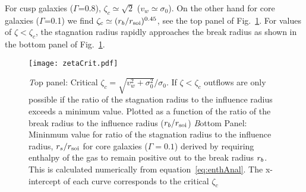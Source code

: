 For cusp galaxies ($\Gamma$=0.8), $\zeta_c\simeq \sqrt 2$
($v_w\simeq\sigma_0$).  On the other hand for core galaxies
($\Gamma$=0.1) we find $\zeta_c\simeq (r_b/r_{\rm soi})^{0.45}$, see the top
panel of Fig.~\ref{fig:zetaCrit}. For values of $\zeta<\zeta_c$, the
stagnation radius rapidly approaches the break radius as shown in the
bottom panel of Fig.~\ref{fig:zetaCrit}.



\begin{figure}
\texttt{[image: zetaCrit.pdf]}
\caption{\label{fig:zetaCrit} {\emph Top panel:} Critical
  $\zeta_c=\sqrt{v_w^2+\sigma_0^2}/\sigma_0$. If $\zeta<\zeta_c$ outflows are
  only possible if the ratio of the stagnation radius to the influence
  radius exceeds a minimum value. Plotted as a function of the ratio
  of the break radius to the influence radius ($r_b/r_{\rm soi}$) {\emph Bottom
    Panel:} Mininmum value for ratio of the stagnation radius to the
  influence radius, $r_s/r_{\rm soi}$ for core galaxies ($\Gamma=0.1$)
  derived by requiring enthalpy of the gas to remain positive out to
  the break radius $r_b$. This is calculated numerically from
  equation~\eqref{eq:enthAnal}. The x-intercept of each curve
  corresponds to the critical $\zeta_c$}
\end{figure}


